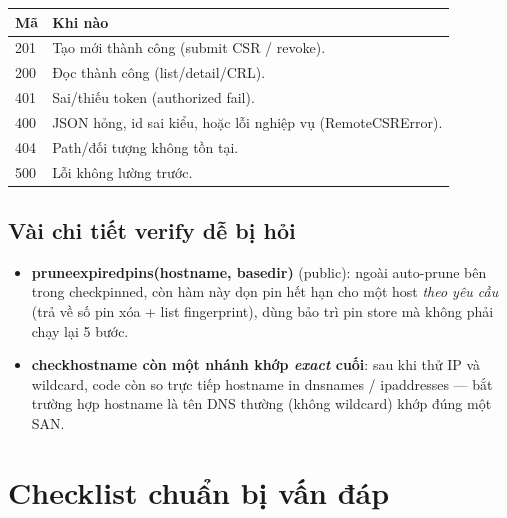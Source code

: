 \documentclass[12pt,a4paper]{article}
\newcommand{\code}[1]{{\ttfamily\small\def\_{\textunderscore\discretionary{}{}{}}#1}}
\begin{document}
\begin{table}[h]
\centering\footnotesize
\begin{tabularx}{\linewidth}{L{2.2cm} X}
\toprule \textbf{Mã} & \textbf{Khi nào} \\ \midrule
\code{201} & Tạo mới thành công (submit CSR / revoke). \\
\code{200} & Đọc thành công (list/detail/CRL). \\
\code{401} & Sai/thiếu token (\code{\_authorized} fail). \\
\code{400} & JSON hỏng, id sai kiểu, hoặc lỗi nghiệp vụ (\code{RemoteCSRError}). \\
\code{404} & Path/đối tượng không tồn tại. \\
\code{500} & Lỗi không lường trước. \\
\bottomrule
\end{tabularx}
\end{table}

\subsection{Vài chi tiết verify dễ bị hỏi}

\begin{itemize}
  \item \textbf{\code{prune\_expired\_pins(hostname, base\_dir)}} (public): ngoài
        auto-prune bên trong \code{check\_pinned}, còn hàm này dọn pin hết hạn cho
        một host \emph{theo yêu cầu} (trả về số pin xóa + list fingerprint), dùng
        bảo trì pin store mà không phải chạy lại 5 bước.
  \item \textbf{\code{check\_hostname} còn một nhánh khớp \emph{exact} cuối}: sau khi
        thử IP và wildcard, code còn so trực tiếp \code{hostname in dns\_names} /
        \code{ip\_addresses} --- bắt trường hợp hostname là tên DNS thường (không
        wildcard) khớp đúng một SAN.
\end{itemize}

\section{Checklist chuẩn bị vấn đáp}
\end{document}
